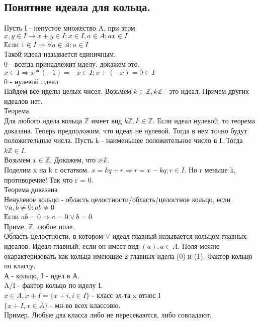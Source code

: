 \documentclass{article}
\begin{document}
\subsection{Понятние идеала для кольца.}
Пусть I - непустое множество A, при этом $x,y \in I \rightarrow x+y \in I; x \in I, a \in A: ax \in I$\\
Если $1 \in I \Rightarrow \forall a \in A: a \in I$\\
Такой идеал называется единичным.\\
0 - всегда принадлежит иделу, докажем это.\\
$x \in I \Rightarrow x*(-1)=-x \in I; x+(-x)=0 \in I$\\
{0} - нулевой идеал \\
Найдем все иделы целых чисел. Возьмем  $k \in \mathbb{Z}, k\mathbb{Z}$ - это идеал. Причем других идеалов нет.\\
Теорема.\\
Для любого идела кольца $\mathbb{Z}$ имеет вид $k\mathbb{Z}, k \in \mathbb{Z}$. Если идеал нулевой, то теорема доказана. Теперь предположим, что идеал не нулевой. Тогда в нем точно будут положительные числа. Пусть k - наименьшее положительное число в I. Тогда $k\mathbb{Z} \in I$.\\
Возьмем $x \in \mathbb{Z}$. Докажем, что $x \vdots k$.\\
Поделим x на k с остатком. $x = kq+r \Rightarrow r = x-kq ; r \in I$. Но r меньше k, противоречие! Так что r = 0.\\
Теорема доказана\\
Ненулевое кольцо - область целостности/область/целостное кольцо, если $\forall a,b \neq 0: ab \neq 0$\\
Если $ab = 0 \Rightarrow a=0 \vee b=0$\\
Приме. $\mathbb{Z}$, любое поле.\\
Область целостности, в котором $\forall$ идеал главный называется кольцом главных идеалов. Идеал главный, если он имеет вид $(a), a \in A$.
Поля можно охарактеризовать как кольца имеющие 2 главных идела (0) и (1).
Фактор кольцо по классу.\\
А - кольцо, I - идел в А.\\
A/I - фактор кольцо по иделу I.\\
$x \in A, x+I = \lbrace x+i, i \in I \rbrace$ - класс эл-та x относ I\\
$\lbrace x+I, x \in A \rbrace$ - мн-во всех классовю.\\
Пример. 
Любые два класса либо не пересекаются, либо совпадают.\\
\end{document}

